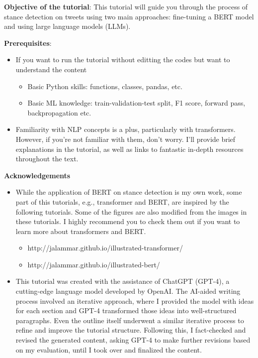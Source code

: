 \documentclass[11pt]{article}
\providecommand{\tightlist}{%
      \setlength{\itemsep}{0pt}\setlength{\parskip}{0pt}}
\begin{document}
\textbf{Objective of the tutorial}: This tutorial will guide you through
the process of stance detection on tweets using two main approaches:
fine-tuning a BERT model and using large language models (LLMs).

\textbf{Prerequisites}:

\begin{itemize}
\tightlist
\item
  If you want to run the tutorial without editting the codes but want to
  understand the content

  \begin{itemize}
  \tightlist
  \item
    Basic Python skills: functions, classes, pandas, etc.
  \item
    Basic ML knowledge: train-validation-test split, F1 score, forward
    pass, backpropagation etc.
  \end{itemize}
\item
  Familiarity with NLP concepts is a plus, particularly with
  transformers. However, if you're not familiar with them, don't worry.
  I'll provide brief explanations in the tutorial, as well as links to
  fantastic in-depth resources throughout the text.
\end{itemize}

    \textbf{Acknowledgements}

\begin{itemize}
\tightlist
\item
  While the application of BERT on stance detection is my own work, some
  part of this tutorials, e.g., transformer and BERT, are inspired by
  the following tutorials. Some of the figures are also modified from
  the images in these tutorials. I highly recommend you to check them
  out if you want to learn more about transformers and BERT.

  \begin{itemize}
  \tightlist
  \item
    http://jalammar.github.io/illustrated-transformer/
  \item
    http://jalammar.github.io/illustrated-bert/
  \end{itemize}
\item
  This tutorial was created with the assistance of ChatGPT (GPT-4), a
  cutting-edge language model developed by OpenAI. The AI-aided writing
  process involved an iterative approach, where I provided the model
  with ideas for each section and GPT-4 transformed those ideas into
  well-structured paragraphs. Even the outline itself underwent a
  similar iterative process to refine and improve the tutorial
  structure. Following this, I fact-checked and revised the generated
  content, asking GPT-4 to make further revisions based on my
  evaluation, until I took over and finalized the content.
\end{itemize}
\end{document}
